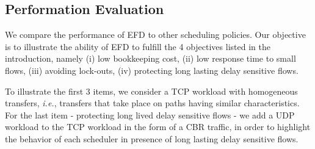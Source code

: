 \documentclass[preprint,12pt]{elsarticle}
\begin{document}
\subsection{Performation Evaluation}
We compare the performance of EFD to other scheduling policies. Our objective is to illustrate the ability of EFD to fulfill the 4 objectives listed in the introduction, namely (i) low bookkeeping cost, (ii) low response time to small flows, (iii) avoiding lock-outs, (iv) protecting long lasting delay sensitive flows.%

To illustrate the first 3 items, we consider a TCP workload with homogeneous transfers, \textit{i.e.}, transfers that take place on paths having similar characteristics. For the last item - protecting long lived delay sensitive flows - we add a UDP workload to the TCP workload in the form of a CBR traffic,  in order to highlight the behavior of each scheduler in presence of long lasting delay sensitive flows. %




 
\end{document}
